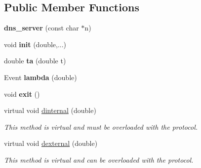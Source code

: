 \subsection*{Public Member Functions}
\begin{DoxyCompactItemize}
\item 
{\bfseries dns\+\_\+server} (const char $\ast$n)\hypertarget{classdns__server_afbeb3f646717cf7960d54385e469b850}{}\label{classdns__server_afbeb3f646717cf7960d54385e469b850}

\item 
void {\bfseries init} (double,...)\hypertarget{classdns__server_a4b17d2d96b3e7a702495b8f44707ec02}{}\label{classdns__server_a4b17d2d96b3e7a702495b8f44707ec02}

\item 
double {\bfseries ta} (double t)\hypertarget{classdns__server_a18ec5017d2e817ddf8d876b3f3f747e5}{}\label{classdns__server_a18ec5017d2e817ddf8d876b3f3f747e5}

\item 
Event {\bfseries lambda} (double)\hypertarget{classdns__server_ad691a03c4bfb71509b3043560c6b73b0}{}\label{classdns__server_ad691a03c4bfb71509b3043560c6b73b0}

\item 
void {\bfseries exit} ()\hypertarget{classdns__server_a05eb620b2f8308ec3818cf5412669890}{}\label{classdns__server_a05eb620b2f8308ec3818cf5412669890}

\item 
virtual void \hyperlink{classdns__server_a51e296892a2de8776c83689f172a0797}{dinternal} (double)
\begin{DoxyCompactList}\small\item\em This method is virtual and must be overloaded with the protocol. \end{DoxyCompactList}\item 
virtual void \hyperlink{classdns__server_a3a6cdeea496be969d034af8a0bdb893f}{dexternal} (double)
\begin{DoxyCompactList}\small\item\em This method is virtual and can be overloaded with the protocol. \end{DoxyCompactList}\end{DoxyCompactItemize}
